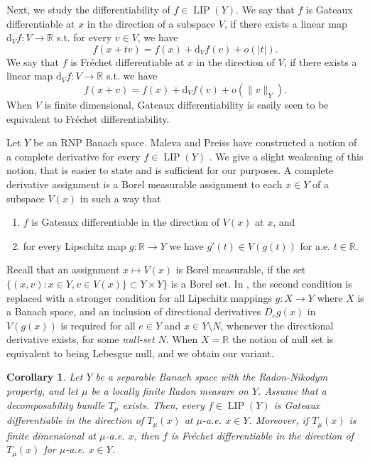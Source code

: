 \documentclass{amsart}
\newtheorem{corollary}[theorem]{Corollary}
\numberwithin{equation}{section}
\newcommand{\R}{\mathbb{R}}
\newcommand{\LIP}{\operatorname{LIP}}
\newcommand{\ud}{\mathrm {d}}
\begin{document}
 Next, we study the differentiability of $f\in \LIP(Y)$. We say that $f$ is Gateaux differentiable at $x$ in the direction of a subspace $V$, if there exists a linear map $\ud_Vf:V\to \R$ s.t. for every $v\in V$, we have
 \[
f(x+tv)=f(x)+\ud_{V}f(v)+o(|t|).
 \]
 We say that $f$ is Fr\'echet differentiable at $x$ in the direction of $V$, if there exists a linear map $\ud_Vf:V\to \R$ s.t. we have
 \[
f(x+v)=f(x)+\ud_{V}f(v)+o(\|v\|_Y).
 \]
 When $V$ is finite dimensional, Gateaux differentiability is easily seen to be equivalent to Fr\'echet differentiability.

Let $Y$ be an RNP Banach space. Maleva and Preiss have constructed a notion of a complete derivative for every $f\in \LIP(Y)$ \cite[Definition 4.1]{malevapreiss}. We give a slight weakening of this notion, that is easier to state and is sufficient for our purposes. A complete derivative assignment is a Borel measurable assignment to each $x\in Y$ of a subspace $V(x)$ in such a way that 
 \begin{enumerate}
     \item $f$ is Gateaux differentiable in the direction of $V(x)$ at $x$, and
     \item for every Lipschitz map $g:\R\to Y$ we have $g'(t)\in V(g(t))$ for a.e. $t\in \R$. 
 \end{enumerate}
 Recall that an assignment $x\mapsto V(x)$ is Borel measurable, if the set $\{(x,v) : x\in Y, v\in V(x)\} \subset Y\times Y\}$ is a Borel set. 
 In \cite{malevapreiss}, the second condition is replaced with a stronger condition for all Lipschitz mappings $g:X\to Y$ where $X$ is a Banach space, and an inclusion of directional derivatives $D_eg(x)$ in $V(g(x))$ is required for all $e\in Y$ and $x\in Y\setminus N$, whenever the directional derivative exists, for some \emph{null-set} $N$. When $X=\R$ the notion of null set is equivalent to being Lebesgue null, and we obtain our variant.
 
\begin{corollary}\label{cor:AM-diff}
Let $Y$ be a separable Banach space with the Radon-Nikodym property, and let $\mu$ be a locally finite Radon measure on $Y$. Assume that a decomposability bundle $T_\mu$ exists. Then, every $f\in \LIP(Y)$ is Gateaux differentiable in the direction of $T_\mu(x)$ at $\mu$-a.e. $x\in Y$. Moreover, if $T_\mu(x)$ is finite dimensional at $\mu$-a.e. $x$, then $f$ is Fr\'echet differentiable in the direction of $T_\mu(x)$ for $\mu$-a.e. $x\in Y$.
\end{corollary}
\end{document}
